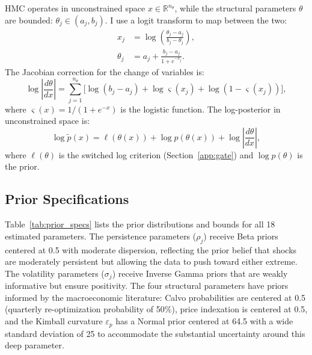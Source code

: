 \documentclass[12pt]{article}
\theoremstyle{plain}
\theoremstyle{definition}
\theoremstyle{remark}
\newcommand{\R}{\mathbb{R}}
\begin{document}
HMC operates in unconstrained space $x \in \R^{n_\theta}$, while the structural parameters $\theta$ are bounded: $\theta_j \in (a_j, b_j)$. I use a logit transform to map between the two:
\begin{align}
x_j &= \log\!\left(\frac{\theta_j - a_j}{b_j - \theta_j}\right), \label{eq:logit_fwd} \\
\theta_j &= a_j + \frac{b_j - a_j}{1 + e^{-x_j}}. \label{eq:logit_inv}
\end{align}
The Jacobian correction for the change of variables is:
\begin{equation}
\log\left|\frac{d\theta}{dx}\right| = \sum_{j=1}^{n_\theta} \bigl[\log(b_j - a_j) + \log\varsigma(x_j) + \log(1 - \varsigma(x_j))\bigr],
\label{eq:logit_jacobian}
\end{equation}
where $\varsigma(x) = 1/(1+e^{-x})$ is the logistic function. The log-posterior in unconstrained space is:
\begin{equation}
\log\tilde{p}(x) = \ell(\theta(x)) + \log p(\theta(x)) + \log\left|\frac{d\theta}{dx}\right|,
\end{equation}
where $\ell(\theta)$ is the switched log criterion (Section~\ref{app:gate}) and $\log p(\theta)$ is the prior.


\subsection{Prior Specifications}

Table~\ref{tab:prior_specs} lists the prior distributions and bounds for all 18 estimated parameters. The persistence parameters ($\rho_j$) receive Beta priors centered at 0.5 with moderate dispersion, reflecting the prior belief that shocks are moderately persistent but allowing the data to push toward either extreme. The volatility parameters ($\sigma_j$) receive Inverse Gamma priors that are weakly informative but ensure positivity. The four structural parameters have priors informed by the macroeconomic literature: Calvo probabilities are centered at 0.5 (quarterly re-optimization probability of 50\%), price indexation is centered at 0.5, and the Kimball curvature $\varepsilon_p$ has a Normal prior centered at 64.5 with a wide standard deviation of 25 to accommodate the substantial uncertainty around this deep parameter.
\end{document}
